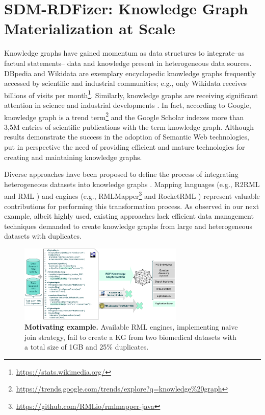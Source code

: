 \section{SDM-RDFizer: Knowledge Graph Materialization at Scale}
Knowledge graphs have gained momentum as data structures to integrate--as factual statements-- data and knowledge present in heterogeneous data sources. 
DBpedia and Wikidata are exemplary encyclopedic knowledge graphs frequently accessed by scientific and industrial communities; e.g., only Wikidata receives billions of visits per month\footnote{\url{https://stats.wikimedia.org/}}. 
Similarly, knowledge graphs are receiving significant attention in science and industrial developments \citep{AuerKPKSV18,NoyGJNPT19}. In fact, according to Google, knowledge graph is a trend term\footnote{\url{https://trends.google.com/trends/explore?q=knowledge\%20graph}} and the Google Scholar indexes more than 3,5M entries of scientific publications with the term knowledge graph.
Although results demonstrate the success in the adoption of Semantic Web technologies, put in perspective the need of providing efficient and mature technologies for creating and maintaining knowledge graphs. 

Diverse approaches have been proposed to define the process of integrating heterogeneous datasets into knowledge graphs \citep{chebotko2009semantics,calvanese2017ontop,chaves2019what,priyatna2014formalisation}. Mapping languages (e.g., R2RML \citep{R2RML} and RML \citep{dimou2014rml}) and engines (e.g., RMLMapper\footnote{\url{https://github.com/RMLio/rmlmapper-java}} and RocketRML \citep{csimcsek2019rocketrml}) represent valuable contributions for performing this transformation process. As observed in our next example, albeit highly used, existing approaches lack efficient data management techniques demanded to create knowledge graphs from large and heterogeneous datasets with duplicates.   
\begin{figure}[t!]
\centering
\includegraphics[width=0.7\textwidth]{figures/Motivating_Example_v1.1.pdf}
\caption{\textbf{Motivating example.} Available RML engines, implementing naive join strategy, fail to create a KG from two biomedical datasets with a total size of 1GB and 25\% duplicates.} 
\label{fig:motivatingExample}
\end{figure}

